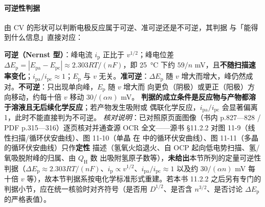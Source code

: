 \paragraph{可逆性判据} 由 CV 的形状可以判断电极反应属于可逆、准可逆还是不可逆，其判据
与「能得到什么信息」直接对应：

\begin{keycond}
\textbf{可逆（Nernst 型）}：峰电流 $i_{\mathrm{p}}$ 正比于 $v^{1/2}$；峰电位差
$\Delta E_{\mathrm{p}}=|E_{\mathrm{pa}}-E_{\mathrm{pc}}|\approx 2.303RT/(nF)$，即
\qty{25}{\celsius} 下约 $59/n$ mV，且\textbf{不随扫描速率变化}；$i_{\mathrm{pa}}/i_{\mathrm{pc}}
\approx1$；$E_{\mathrm{p}}$ 与 $v$ 无关。\textbf{准可逆}：$\Delta E_{\mathrm{p}}$ 随 $v$
增大而增大，峰仍然成对。\textbf{不可逆}：只出现单向峰，$E_{\mathrm{p}}$ 随 $v$ 增大而
向更负（阴极）或更正（阳极）方向移动，约每十倍 $v$ 移动 $30/(\alpha n)$ mV。
\textbf{判据的成立条件是反应物与产物都溶于溶液且无后续化学反应}；若产物发生吸附或
偶联化学反应，$i_{\mathrm{pa}}/i_{\mathrm{pc}}$ 会显著偏离 1，此时不能直接判为不可逆。
\emph{核对说明}：已对照原页面图像（书内 p.827—828 / PDF p.315—316）逐页核对并通查源
OCR 全文——源书 §11.2.2 对图 11-9（线性扫描/循环伏安曲线）、图 11-10（单晶  在
 中的循环伏安曲线）、图 11-11（多晶  的循环伏安曲线）只作\textbf{定性}
描述（氢氧火焰退火、自 OCP 起向低电势扫描、氢/氧吸脱附峰的归属、由 $Q_{\mathrm{H}}$ 数
出吸附氢原子数等），\textbf{未给出}本节所列的定量可逆性判据（$\Delta E_{\mathrm{p}}\approx
2.303RT/(nF)$、$i_{\mathrm{p}}\propto v^{1/2}$、$i_{\mathrm{pa}}/i_{\mathrm{pc}}\approx1$
以及约 $30/(\alpha n)$ mV 每十倍 $v$ 等），故本节判据系按电化学标准形式重建。若本书
11.2.2 之后另有专门的判据小节，应在统一核验时对齐符号（是否用 $D^{1/2}$、是否含
$n^{3/2}$、是否讨论 $\Delta E_{\mathrm{p}}$ 的严格表值）。
\end{keycond}

